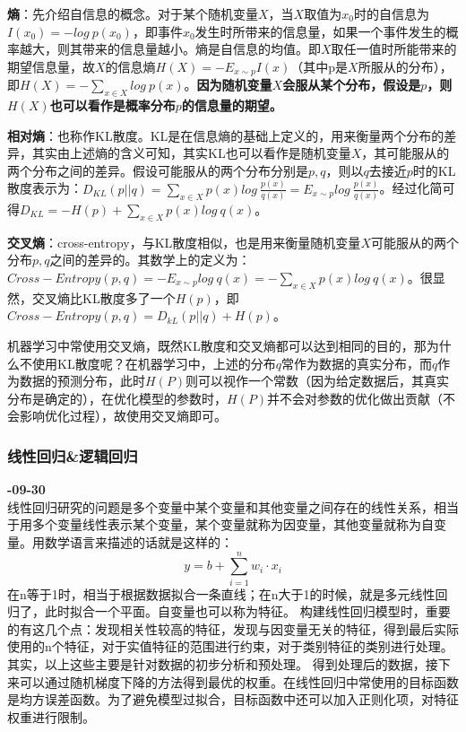 \textbf{熵}：先介绍自信息的概念。对于某个随机变量$X$，当$X$取值为$x_0$时的自信息为$I(x_0) = -log\ p(x_0)$，即事件$x_0$发生时所带来的信息量，如果一个事件发生的概率越大，则其带来的信息量越小。熵是自信息的均值。即$X$取任一值时所能带来的期望信息量，故$X$的信息熵$H(X) = -E_{x\sim p}I(x)$（其中p是$X$所服从的分布），即$H(X) = -\sum_{x \in X}log\ p(x)$。\textbf{因为随机变量$X$会服从某个分布，假设是$p$，则$H(X)$也可以看作是概率分布$p$的信息量的期望。}

\textbf{相对熵}：也称作KL散度。KL是在信息熵的基础上定义的，用来衡量两个分布的差异，其实由上述熵的含义可知，其实KL也可以看作是随机变量$X$，其可能服从的两个分布之间的差异。假设可能服从的两个分布分别是$p, q$，则以$q$去接近$p$时的KL散度表示为：$D_{KL}(p||q) = \sum_{x \in X} p(x) log\ \frac{p(x)}{q(x)} = E_{x\sim p} log\ \frac{p(x)}{q(x)}$。经过化简可得$D_{KL} = -H(p) + \sum_{x \in X}p(x)log\ q(x)$。

\textbf{交叉熵}：\label{ce}cross-entropy，与KL散度相似，也是用来衡量随机变量$X$可能服从的两个分布$p, q$之间的差异的。其数学上的定义为：$Cross-Entropy(p, q) = -E_{x\sim p} log\ q(x) = - \sum_{x \in X}p(x)log\ q(x)$。很显然，交叉熵比KL散度多了一个$H(p)$，即$Cross-Entropy(p, q) = D_{kL}(p || q) + H(p)$。

机器学习中常使用交叉熵，既然KL散度和交叉熵都可以达到相同的目的，那为什么不使用KL散度呢？在机器学习中，上述的分布$q$常作为数据的真实分布，而$q$作为数据的预测分布，此时$H(P)$则可以视作一个常数（因为给定数据后，其真实分布是确定的），在优化模型的参数时，$H(P)$并不会对参数的优化做出贡献（不会影响优化过程），故使用交叉熵即可。

\subsubsection{线性回归\&逻辑回归}
\textbf{-09-30}\\
线性回归研究的问题是多个变量中某个变量和其他变量之间存在的线性关系，相当于用多个变量线性表示某个变量，某个变量就称为因变量，其他变量就称为自变量。用数学语言来描述的话就是这样的：
$$
y=b + \sum_{i=1}^{n} w_i \cdot x_i 
$$
在n等于1时，相当于根据数据拟合一条直线；在n大于1的时候，就是多元线性回归了，此时拟合一个平面。自变量也可以称为特征。
构建线性回归模型时，重要的有这几个点：发现相关性较高的特征，发现与因变量无关的特征，得到最后实际使用的n个特征，对于实值特征的范围进行约束，对于类别特征的类别进行处理。其实，以上这些主要是针对数据的初步分析和预处理。
得到处理后的数据，接下来可以通过随机梯度下降的方法得到最优的权重。在线性回归中常使用的目标函数是均方误差函数。为了避免模型过拟合，目标函数中还可以加入正则化项，对特征权重进行限制。

